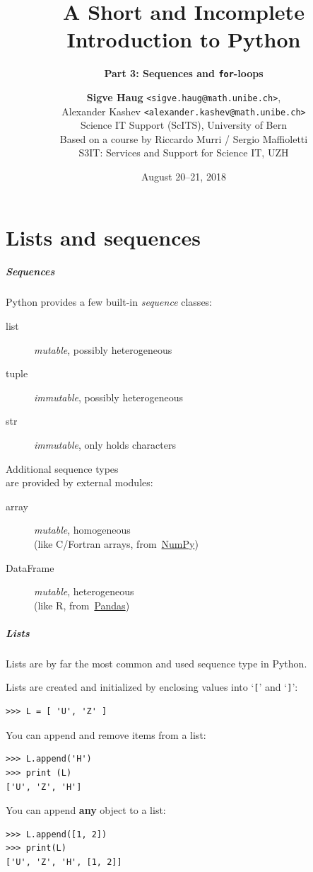 \documentclass[english,serif,mathserif,xcolor=pdftex,dvipsnames,table]{beamer}
\title[3. Sequences and loops]{%
  A Short and Incomplete Introduction to Python
}
\subtitle{\bfseries Part 3: Sequences and \texttt{for}-loops}
\author[S.~Haug]{%
  \textbf{Sigve Haug} \texttt{<sigve.haug@math.unibe.ch>}, \\
  Alexander Kashev \texttt{<alexander.kashev@math.unibe.ch>} \\
  Science IT Support (ScITS), University of Bern \\
  \medskip
  Based on a course by Riccardo Murri / Sergio Maffioletti
  \\
  S3IT: Services and Support for Science IT, UZH
}
\date{August 20--21, 2018}
\begin{document}
\maketitle


\part{Lists and sequences}

\begin{frame}
  \frametitle{Sequences}

  Python provides a few built-in \emph{sequence} classes:
  \begin{description}
  \item[list] \emph{mutable}, possibly heterogeneous
  \item[tuple] \emph{immutable}, possibly heterogeneous
  \item[str] \emph{immutable}, only holds characters
  \end{description}

  \+
  Additional sequence types \\ are provided by external modules:
  \begin{description}
  \item[array] \emph{mutable}, homogeneous \\ (like C/Fortran arrays,
    from~\href{http://numpy.scipy.org}{NumPy})
  \item[DataFrame] \emph{mutable}, heterogeneous \\ (like R,
    from~\href{http://pandas.pydata.org/}{Pandas})
  \end{description}

\end{frame}


\begin{frame}[fragile]
  \frametitle{Lists}
  Lists are by far the most common and used sequence type in Python.

  \+
  Lists are created and initialized by enclosing values into
  `\texttt{[}' and `\texttt{]}':
\begin{lstlisting}
>>> L = [ 'U', 'Z' ]
\end{lstlisting}

  \+\pause
  You can append and remove items from a list:
\begin{lstlisting}
>>> L.append('H')
>>> print (L)
['U', 'Z', 'H']
\end{lstlisting}

  \+\pause
  You can append \textbf{any} object to a list:
\begin{lstlisting}
>>> L.append([1, 2])
>>> print(L)
['U', 'Z', 'H', [1, 2]]
\end{lstlisting}

\end{frame}
\end{document}
